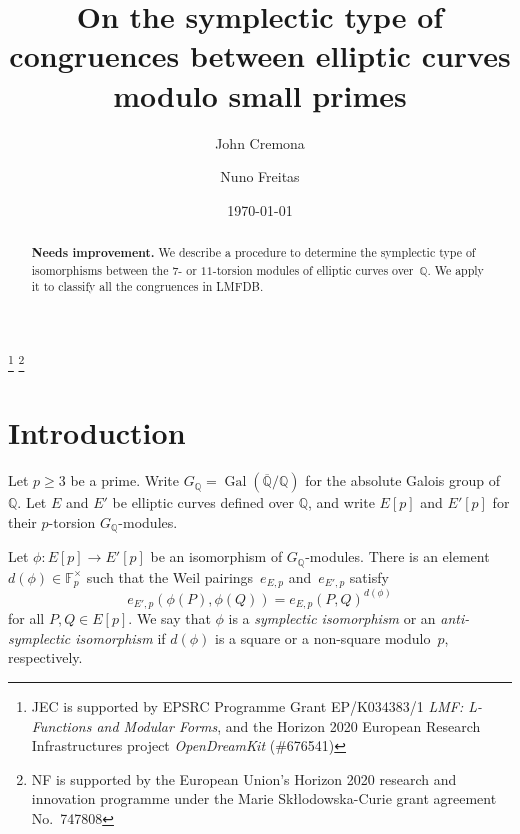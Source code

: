 \documentclass[12pt]{amsart}
\newcommand{\F}{\mathbb{F}}
\newcommand{\Q}{\mathbb{Q}}
\newcommand{\Qbar}{{\overline{\Q}}}
\DeclareMathOperator{\Gal}{Gal}
\numberwithin{equation}{section}
\theoremstyle{definition}
\theoremstyle{remark}
\begin{document}
\title{On the symplectic type of congruences between elliptic curves modulo small primes}

\author{John Cremona}
\address{Mathematics Institute,
         University of Warwick,
         Coventry CV4 7AL,
         United Kingdom}


\author{Nuno Freitas}
\address{Mathematics Institute,
         University of Warwick,
         Coventry CV4 7AL,
         United Kingdom}


\date{\today}


\thanks{JEC is supported by EPSRC Programme Grant EP/K034383/1
  \textit{LMF: L-Functions and Modular Forms}, and the Horizon 2020
  European Research Infrastructures project \textit{OpenDreamKit}
  (\#676541)}
\thanks{NF is supported by the European Union's
  Horizon 2020 research and innovation programme under the Marie
  Sk\l{l}odowska-Curie grant agreement No.\ 747808}


\begin{abstract} {\bf Needs improvement.}
We describe a procedure to determine the symplectic type of
isomorphisms between the $7$- or $11$-torsion modules of elliptic curves over~$\Q$.  We
apply it to classify all the congruences in LMFDB.
\end{abstract}

\maketitle


\section{Introduction}

Let $p \geq 3$ be a prime. Write $G_\Q = \Gal(\Qbar/\Q)$ for the
absolute Galois group of $\Q$.  Let $E$ and $E'$ be elliptic curves defined over $\Q$, and write $E[p]$ and $E'[p]$ for their $p$-torsion $G_\Q$-modules.

Let $\phi : E[p] \to E'[p]$ be an isomorphism of $G_\Q$-modules.
There is an element $d(\phi) \in \F_p^\times$ such that the Weil 
pairings~$e_{E,p}$ and~$e_{E',p}$ satisfy
\[
e_{E',p}(\phi(P), \phi(Q)) = e_{E,p}(P, Q)^{d(\phi)}
\]
for all $P, Q \in E[p]$.  We say that $\phi$ is a {\it symplectic
  isomorphism} or an {\it anti-symplectic isomorphism} if $d(\phi)$ is
a square or a non-square modulo~$p$, respectively.
\end{document}
